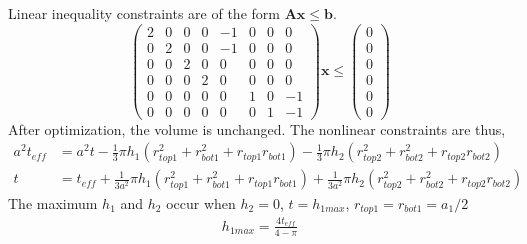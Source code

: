 \documentclass[12pt]{article}
\numberwithin{equation}{section}
\numberwithin{equation}{section}
\begin{document}
\begin{outline}[enumerate]
Linear inequality constraints are of the form $\mathbf{A} \mathbf{x} \leq \mathbf{b}$.
\setcounter{MaxMatrixCols}{20}
\begin{equation}
\left(
\begin{matrix}
2 & 0 & 0 & 0 & -1  & 0 & 0 & 0 \\
0 & 2 & 0 & 0 & -1  & 0 & 0 & 0\\
0 & 0 & 2 & 0 & 0 &  0 & 0 & 0\\
0 & 0 & 0 & 2 & 0 & 0 & 0 & 0 \\
0 & 0 & 0 & 0 & 0 & 1 & 0 & -1 \\
0 & 0 & 0 & 0 & 0 & 0 & 1 & -1 
\end{matrix}
\right ) \mathbf{x}  \leq \left ( \begin{matrix} 0\\ 0\\ 0\\ 0 \\0 \\ 0 \end{matrix} \right ) 
\end{equation}
After optimization, the volume is unchanged. The nonlinear constraints are thus,
\begin{align}
a^2t_{eff} &=a^2t - \frac{1}{3}\pi h_1(r_{top1}^2+r_{bot1}^2+r_{top1}r_{bot1})- \frac{1}{3}\pi h_2(r_{top2}^2+r_{bot2}^2+r_{top2}r_{bot2})\nonumber \\
t &= t_{eff} + \frac{1}{3a^2}\pi h_1(r_{top1}^2+r_{bot1}^2+r_{top1}r_{bot1})+ \frac{1}{3a^2} \pi h_2(r_{top2}^2+r_{bot2}^2+r_{top2}r_{bot2})
\end {align}
The maximum $h_1$ and $h_2$ occur when $h_2 = 0$, $t = h_{1max}$, $r_{top1} = r_{bot1} = a_1/2$ 
\begin{align*}
h_{1max} = \frac {4t_{eff}}{4- \pi}\\
\end {align*}

\end{outline}
\end{document}
